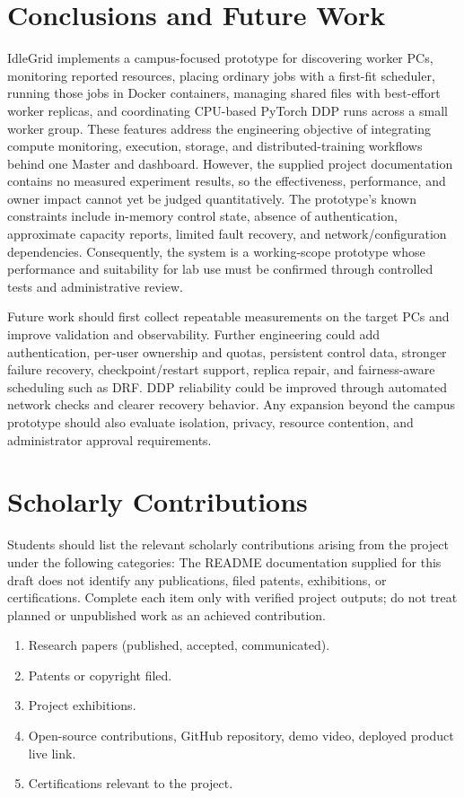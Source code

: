 \documentclass{article}
\begin{document}
\pagebreak
\section{Conclusions and Future Work}

IdleGrid implements a campus-focused prototype for discovering worker PCs, monitoring reported resources, placing ordinary jobs with a first-fit scheduler, running those jobs in Docker containers, managing shared files with best-effort worker replicas, and coordinating CPU-based PyTorch DDP runs across a small worker group. These features address the engineering objective of integrating compute monitoring, execution, storage, and distributed-training workflows behind one Master and dashboard. However, the supplied project documentation contains no measured experiment results, so the effectiveness, performance, and owner impact cannot yet be judged quantitatively. The prototype's known constraints include in-memory control state, absence of authentication, approximate capacity reports, limited fault recovery, and network/configuration dependencies. Consequently, the system is a working-scope prototype whose performance and suitability for lab use must be confirmed through controlled tests and administrative review.

Future work should first collect repeatable measurements on the target PCs and improve validation and observability. Further engineering could add authentication, per-user ownership and quotas, persistent control data, stronger failure recovery, checkpoint/restart support, replica repair, and fairness-aware scheduling such as DRF. DDP reliability could be improved through automated network checks and clearer recovery behavior. Any expansion beyond the campus prototype should also evaluate isolation, privacy, resource contention, and administrator approval requirements.

\pagebreak

\section{Scholarly Contributions}
Students should list the relevant scholarly contributions arising from the project under the following categories:
The README documentation supplied for this draft does not identify any publications, filed patents, exhibitions, or certifications. Complete each item only with verified project outputs; do not treat planned or unpublished work as an achieved contribution.
\begin{enumerate}
	\item Research papers (published, accepted, communicated).
	\item Patents or copyright filed.
	\item Project exhibitions.
	\item Open-source contributions, GitHub repository, demo video, deployed product live link.
	\item Certifications relevant to the project.
\end{enumerate}
\end{document}
